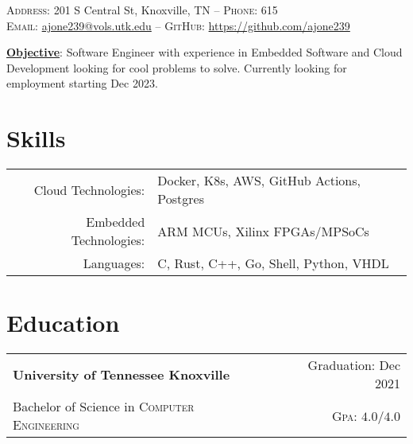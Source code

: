 \documentclass[a4paper,12pt]{article}
\begin{document}

\pagestyle{empty} %


\par{\smallskip{}
\par{\small \textsc{Address:} 201 S Central St, Knoxville, TN \---
\small \textsc{Phone:} 615\\
\textsc{Email:} \href{mailto:ajones53.aj@gmail.com}{ajone239@vols.utk.edu} \---
\textsc{GitHub:} \href{https://github.com/ajone239}{https://github.com/ajone239}
} \smallskip{}
\par{\textbf{\underline{Objective}}: Software Engineer with experience in Embedded Software and Cloud Development looking for cool problems to solve.
Currently looking for employment starting Dec 2023.
}\smallskip}{}



\section{Skills}
\begin{tabularx}{\textwidth}{rl}
   Cloud Technologies: & Docker, K8s, AWS, GitHub Actions, Postgres \\
   Embedded Technologies: & ARM MCUs, Xilinx FPGAs/MPSoCs \\
   Languages: & C, Rust, C++, Go, Shell, Python, VHDL \\
\end{tabularx}

\section{Education}
\begin{tabularx}{\textwidth}{lXr}
   \textbf{University of Tennessee Knoxville} & & Graduation: Dec 2021\\
   Bachelor of Science in \textsc{Computer Engineering} &  & \normalsize \textsc{Gpa}: $4.0/4.0$\\
\end{tabularx}
\end{document}
